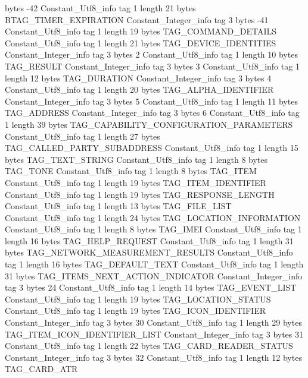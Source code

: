 {{{			bytes	-42
		}
		Constant_Utf8_info {
			tag	1
			length	21
			bytes	BTAG_TIMER_EXPIRATION
		}
		Constant_Integer_info {
			tag	3
			bytes	-41
		}
		Constant_Utf8_info {
			tag	1
			length	19
			bytes	TAG_COMMAND_DETAILS
		}
		Constant_Utf8_info {
			tag	1
			length	21
			bytes	TAG_DEVICE_IDENTITIES
		}
		Constant_Integer_info {
			tag	3
			bytes	2
		}
		Constant_Utf8_info {
			tag	1
			length	10
			bytes	TAG_RESULT
		}
		Constant_Integer_info {
			tag	3
			bytes	3
		}
		Constant_Utf8_info {
			tag	1
			length	12
			bytes	TAG_DURATION
		}
		Constant_Integer_info {
			tag	3
			bytes	4
		}
		Constant_Utf8_info {
			tag	1
			length	20
			bytes	TAG_ALPHA_IDENTIFIER
		}
		Constant_Integer_info {
			tag	3
			bytes	5
		}
		Constant_Utf8_info {
			tag	1
			length	11
			bytes	TAG_ADDRESS
		}
		Constant_Integer_info {
			tag	3
			bytes	6
		}
		Constant_Utf8_info {
			tag	1
			length	39
			bytes	TAG_CAPABILITY_CONFIGURATION_PARAMETERS
		}
		Constant_Utf8_info {
			tag	1
			length	27
			bytes	TAG_CALLED_PARTY_SUBADDRESS
		}
		Constant_Utf8_info {
			tag	1
			length	15
			bytes	TAG_TEXT_STRING
		}
		Constant_Utf8_info {
			tag	1
			length	8
			bytes	TAG_TONE
		}
		Constant_Utf8_info {
			tag	1
			length	8
			bytes	TAG_ITEM
		}
		Constant_Utf8_info {
			tag	1
			length	19
			bytes	TAG_ITEM_IDENTIFIER
		}
		Constant_Utf8_info {
			tag	1
			length	19
			bytes	TAG_RESPONSE_LENGTH
		}
		Constant_Utf8_info {
			tag	1
			length	13
			bytes	TAG_FILE_LIST
		}
		Constant_Utf8_info {
			tag	1
			length	24
			bytes	TAG_LOCATION_INFORMATION
		}
		Constant_Utf8_info {
			tag	1
			length	8
			bytes	TAG_IMEI
		}
		Constant_Utf8_info {
			tag	1
			length	16
			bytes	TAG_HELP_REQUEST
		}
		Constant_Utf8_info {
			tag	1
			length	31
			bytes	TAG_NETWORK_MEASUREMENT_RESULTS
		}
		Constant_Utf8_info {
			tag	1
			length	16
			bytes	TAG_DEFAULT_TEXT
		}
		Constant_Utf8_info {
			tag	1
			length	31
			bytes	TAG_ITEMS_NEXT_ACTION_INDICATOR
		}
		Constant_Integer_info {
			tag	3
			bytes	24
		}
		Constant_Utf8_info {
			tag	1
			length	14
			bytes	TAG_EVENT_LIST
		}
		Constant_Utf8_info {
			tag	1
			length	19
			bytes	TAG_LOCATION_STATUS
		}
		Constant_Utf8_info {
			tag	1
			length	19
			bytes	TAG_ICON_IDENTIFIER
		}
		Constant_Integer_info {
			tag	3
			bytes	30
		}
		Constant_Utf8_info {
			tag	1
			length	29
			bytes	TAG_ITEM_ICON_IDENTIFIER_LIST
		}
		Constant_Integer_info {
			tag	3
			bytes	31
		}
		Constant_Utf8_info {
			tag	1
			length	22
			bytes	TAG_CARD_READER_STATUS
		}
		Constant_Integer_info {
			tag	3
			bytes	32
		}
		Constant_Utf8_info {
			tag	1
			length	12
			bytes	TAG_CARD_ATR
}}}
